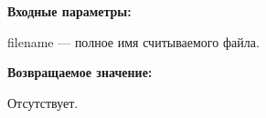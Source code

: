 \textbf{Входные параметры:}

filename --- полное имя считываемого файла.

\textbf{Возвращаемое значение:}

Отсутствует.
